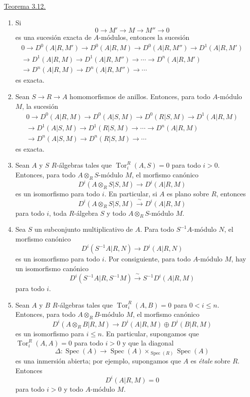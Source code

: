 
\underline{Teorema 3.12.}

\begin{enumerate}[label=(\arabic*)]
\item Si
\[
 0\longrightarrow M'\longrightarrow M\longrightarrow M''
 \longrightarrow0
\]
es una sucesión exacta de $A$-módulos, entonces la sucesión
\begin{multline*}
0\longrightarrow D^0(A|R,M')\longrightarrow D^0(A|R,M)
\longrightarrow D^0(A|R,M'')\longrightarrow D^1(A|R,M')\\
\longrightarrow D^1(A|R,M)\longrightarrow D^1(A|R,M'')
\longrightarrow\cdots\longrightarrow D^n(A|R,M')\\
\longrightarrow D^n(A|R,M)\longrightarrow D^n(A|R,M'')
\longrightarrow\cdots
\end{multline*}
es exacta.

\item Sean $S\longrightarrow R\longrightarrow A$ homomorfismos de
anillos. Entonces, para todo $A$-módulo $M$, la sucesión
\begin{multline*}
0\longrightarrow D^0(A|R,M)\longrightarrow D^0(A|S,M)
\longrightarrow D^0(R|S,M)\longrightarrow D^1(A|R,M)\\
\longrightarrow D^1(A|S,M)\longrightarrow D^1(R|S,M)
\longrightarrow\cdots\longrightarrow D^n(A|R,M)\\
\longrightarrow D^n(A|S,M)\longrightarrow D^n(R|S,M)
\longrightarrow\cdots
\end{multline*}
es exacta.

\item Sean $A$ y $S$ $R$-álgebras tales que
$\operatorname{Tor}_i^R(A,S)=0$ para todo $i>0$. Entonces, para todo
$A\otimes_RS$-módulo $M$, el morfismo canónico
\[
 D^i(A\otimes_RS|S,M)\longrightarrow D^i(A|R,M)
\]
es un isomorfismo para todo $i$. En particular, si $A$ es plano sobre
$R$, entonces
\[
 D^i(A\otimes_RS|S,M)\xrightarrow{\ \sim\ }D^i(A|R,M)
\]
para todo $i$, toda $R$-álgebra $S$ y todo $A\otimes_RS$-módulo $M$.

\item Sea $S$ un subconjunto multiplicativo de $A$. Para todo
$S^{-1}A$-módulo $N$, el morfismo canónico
\[
 D^i(S^{-1}A|R,N)\longrightarrow D^i(A|R,N)
\]
es un isomorfismo para todo $i$. Por consiguiente, para todo $A$-módulo
$M$, hay un isomorfismo canónico
\[
 D^i(S^{-1}A|R,S^{-1}M)
 \xrightarrow{\ \sim\ }S^{-1}D^i(A|R,M)
\]
para todo $i$.

\item Sean $A$ y $B$ $R$-álgebras tales que
$\operatorname{Tor}_i^R(A,B)=0$ para $0<i\leq n$. Entonces, para todo
$A\otimes_RB$-módulo $M$, el morfismo canónico
\[
 D^i(A\otimes_RB|R,M)
 \longrightarrow D^i(A|R,M)\oplus D^i(B|R,M)
\]
es un isomorfismo para $i\leq n$. En particular, supongamos que
$\operatorname{Tor}_i^R(A,A)=0$ para todo $i>0$ y que la diagonal
\[
 \Delta:\operatorname{Spec}(A)\longrightarrow
 \operatorname{Spec}(A)\times_{\operatorname{Spec}(R)}
 \operatorname{Spec}(A)
\]
es una inmersión abierta; por ejemplo, supongamos que $A$ es
\emph{étale} sobre $R$. Entonces
\[
 D^i(A|R,M)=0
\]
para todo $i>0$ y todo $A$-módulo $M$.


\end{enumerate}
